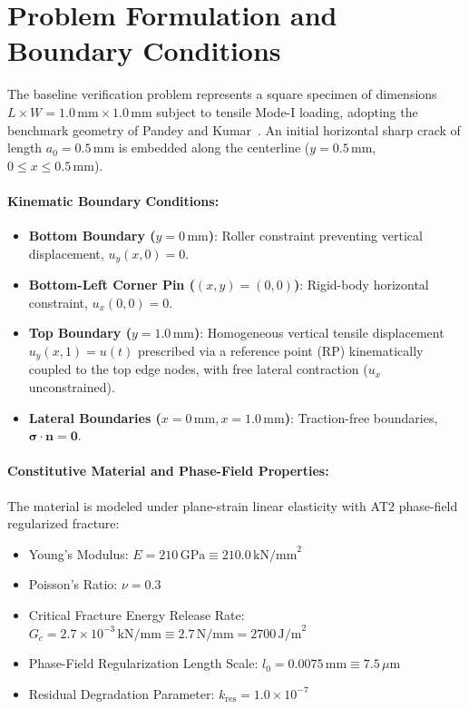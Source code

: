 \section{Problem Formulation and Boundary Conditions}
\label{sec:problem_formulation_mode1}

The baseline verification problem represents a square specimen of dimensions $L \times W = 1.0\,\text{mm} \times 1.0\,\text{mm}$ subject to tensile Mode-I loading, adopting the benchmark geometry of Pandey and Kumar~\citep{pandey2025}. An initial horizontal sharp crack of length $a_0 = 0.5\,\text{mm}$ is embedded along the centerline ($y = 0.5\,\text{mm}$, $0 \le x \le 0.5\,\text{mm}$).

\paragraph{Kinematic Boundary Conditions:}
\begin{itemize}
    \item \textbf{Bottom Boundary ($y = 0\,\text{mm}$)}: Roller constraint preventing vertical displacement, $u_y(x, 0) = 0$.
    \item \textbf{Bottom-Left Corner Pin ($(x, y) = (0, 0)$)}: Rigid-body horizontal constraint, $u_x(0, 0) = 0$.
    \item \textbf{Top Boundary ($y = 1.0\,\text{mm}$)}: Homogeneous vertical tensile displacement $u_y(x, 1) = u(t)$ prescribed via a reference point (RP) kinematically coupled to the top edge nodes, with free lateral contraction ($u_x$ unconstrained).
    \item \textbf{Lateral Boundaries ($x = 0\,\text{mm}, x = 1.0\,\text{mm}$)}: Traction-free boundaries, $\boldsymbol{\sigma} \cdot \mathbf{n} = \mathbf{0}$.
\end{itemize}

\paragraph{Constitutive Material and Phase-Field Properties:}
The material is modeled under plane-strain linear elasticity with AT2 phase-field regularized fracture:
\begin{itemize}
    \item Young's Modulus: $E = 210\,\text{GPa} \equiv 210.0\,\text{kN/mm}^2$
    \item Poisson's Ratio: $\nu = 0.3$
    \item Critical Fracture Energy Release Rate: $G_c = 2.7\times 10^{-3}\,\text{kN/mm} \equiv 2.7\,\text{N/mm} = 2700\,\text{J/m}^2$
    \item Phase-Field Regularization Length Scale: $l_0 = 0.0075\,\text{mm} \equiv 7.5\,\mu\text{m}$
    \item Residual Degradation Parameter: $k_{\text{res}} = 1.0 \times 10^{-7}$
\end{itemize}

